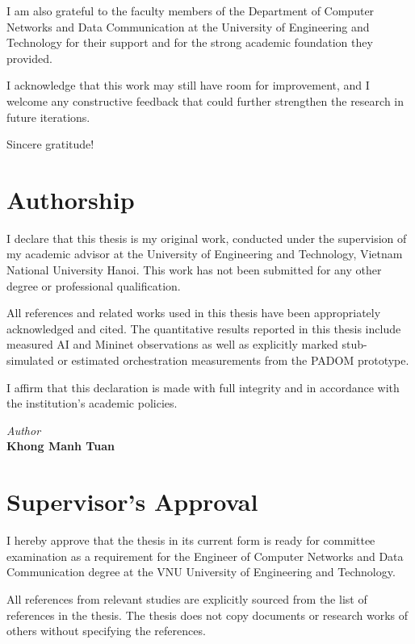 \documentclass[12pt, a4paper, reqno, oneside]{book}
\newcommand{\padonap}{\textsc{PADOM}}
\begin{document}
I am also grateful to the faculty members of the Department of Computer Networks and Data Communication at the University of Engineering and Technology for their support and for the strong academic foundation they provided.

I acknowledge that this work may still have room for improvement, and I welcome any constructive feedback that could further strengthen the research in future iterations.

Sincere gratitude!

\newpage

\chapter*{Authorship}
\vspace{20pt}

I declare that this thesis is my original work, conducted under the supervision of my academic advisor at the University of Engineering and Technology, Vietnam National University Hanoi. This work has not been submitted for any other degree or professional qualification.

All references and related works used in this thesis have been appropriately acknowledged and cited. The quantitative results reported in this thesis include measured AI and Mininet observations as well as explicitly marked stub-simulated or estimated orchestration measurements from the \padonap{} prototype.

I affirm that this declaration is made with full integrity and in accordance with the institution's academic policies.

\begin{flushright}
{\it Author}\\[2cm]
{\bf Khong Manh Tuan}
\end{flushright}
\newpage

\chapter*{Supervisor's Approval}
\vspace{20pt}

I hereby approve that the thesis in its current form is ready for committee examination as a requirement for the Engineer of Computer Networks and Data Communication degree at the VNU University of Engineering and Technology.

All references from relevant studies are explicitly sourced from the list of references in the thesis. The thesis does not copy documents or research works of others without specifying the references.
\end{document}
